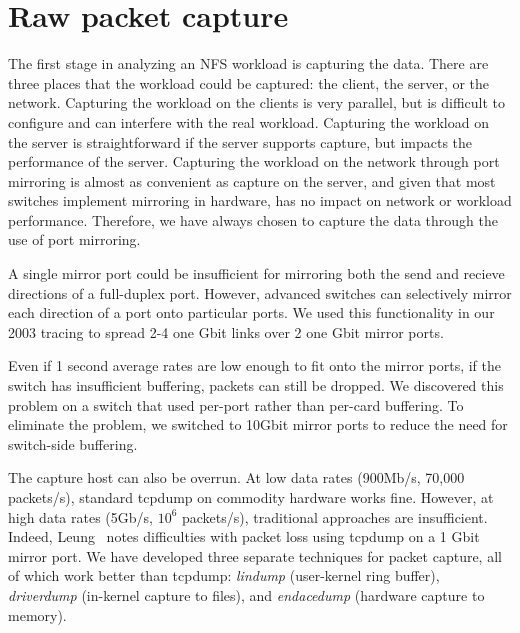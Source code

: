 \section{Raw packet capture}
\label{sec:capture}

The first stage in analyzing an NFS workload is capturing the data.
There are three places that the workload could be captured: the
client, the server, or the network.  Capturing the workload on the
clients is very parallel, but is difficult to configure and can
interfere with the real workload.  Capturing the workload on the
server is straightforward if the server supports capture, 
but impacts the performance of the
server.  Capturing the workload on the network through port mirroring
is almost as convenient as capture on the server, and given that most
switches implement mirroring in hardware, has no impact on network or
workload performance.  
Therefore, we have always chosen to capture the
data through the use of port mirroring.

A single mirror port could be insufficient for mirroring both the send
and recieve directions of a full-duplex port.  However, advanced
switches can selectively mirror each direction of a port onto
particular ports.  We used this functionality in our 2003 tracing to
spread 2-4 one Gbit links over 2 one Gbit mirror ports.

Even if 1 second average rates are low enough to fit onto the mirror
ports, if the switch has insufficient buffering, packets can still be
dropped. We discovered this problem on a switch that used per-port
rather than per-card buffering.  To eliminate the problem, we switched
to 10Gbit mirror ports to reduce the need for switch-side buffering.

The capture host can also be overrun. At low data rates (900Mb/s,
70,000 packets/s), standard tcpdump on commodity hardware works fine.
However, at high data rates (5Gb/s, $10^6$ packets/s),
traditional approaches are insufficient. Indeed,
Leung~\cite{LeungUsenix08} notes
difficulties with packet loss using tcpdump on a 1 Gbit mirror port.
We have developed three separate techniques for packet capture, all of
which work better than tcpdump: {\it lindump} (user-kernel ring
buffer), {\it driverdump} (in-kernel capture to files), and {\it
endacedump} (hardware capture to memory).  

